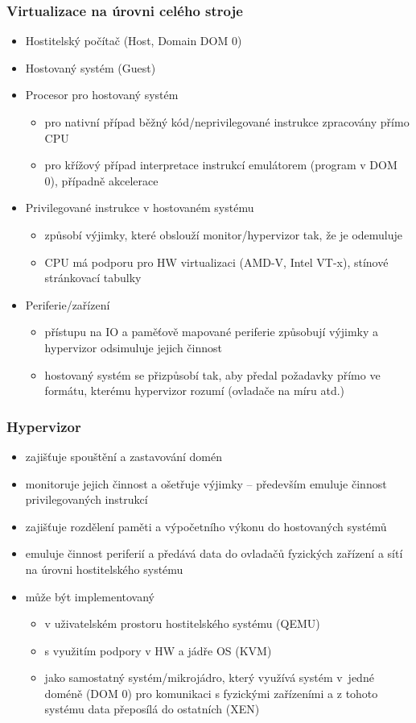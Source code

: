 \documentclass{beamer}
\begin{document}
\begin{frame}
\frametitle{Virtualizace na úrovni celého stroje}

\begin{itemize}
 \item Hostitelský počítač (Host, Domain DOM 0)
 \item Hostovaný systém (Guest)
 \item Procesor pro hostovaný systém
 \begin{itemize}
  \item pro nativní případ běžný kód/neprivilegované instrukce zpracovány přímo CPU
  \item pro křížový případ interpretace instrukcí emulátorem (program v DOM 0), případně akcelerace
 \end{itemize}
 \item Privilegované instrukce v hostovaném systému
 \begin{itemize}
  \item způsobí výjimky, které obslouží monitor/hypervizor tak, že je odemuluje
  \item CPU má podporu pro HW virtualizaci (AMD-V, Intel VT-x), stínové stránkovací tabulky
 \end{itemize}
 \item Periferie/zařízení
 \begin{itemize}
  \item přístupu na IO a paměťově mapované periferie způsobují výjimky a hypervizor odsimuluje jejich činnost
  \item hostovaný systém se přizpůsobí tak, aby předal požadavky přímo ve formátu, kterému hypervizor rozumí (ovladače na míru atd.)
 \end{itemize}
\end{itemize}
\end{frame}

\begin{frame}
\frametitle{Hypervizor}

\begin{itemize}
 \item zajišťuje spouštění a zastavování domén
 \item monitoruje jejich činnost a ošetřuje výjimky – především emuluje činnost privilegovaných instrukcí
 \item zajišťuje rozdělení paměti a výpočetního výkonu do hostovaných systémů
 \item emuluje činnost periferií a předává data do ovladačů fyzických zařízení a sítí na úrovni hostitelského systému
 \item může být implementovaný
 \begin{itemize}
  \item v uživatelském prostoru hostitelského systému (QEMU)
  \item s využitím podpory v HW a jádře OS (KVM)
  \item jako samostatný systém/mikrojádro, který využívá systém v jedné doméně (DOM 0) pro komunikaci s fyzickými zařízeními a z tohoto systému data přeposílá do ostatních (XEN)
 \end{itemize}
\end{itemize}
\end{frame}
\end{document}

